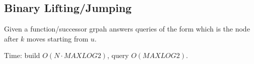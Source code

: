 \subsection{Binary Lifting/Jumping}

Given a function/successor grpah answers queries of the form which is the node after $k$ moves starting from $u$.

Time: build $O(N \cdot MAXLOG2)$, query $O(MAXLOG2)$.
